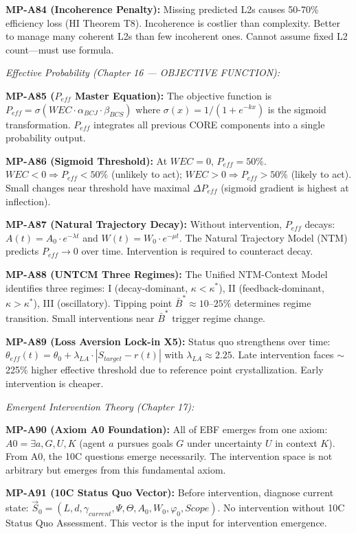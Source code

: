 \begin{tcolorbox}[colback=gray!5!white, colframe=gray!75!black,
    title=\textbf{MP Axioms}]
\textbf{MP-A84 (Incoherence Penalty):} Missing predicted L2s causes 50-70\% efficiency loss (HI Theorem T8). Incoherence is costlier than complexity. Better to manage many coherent L2s than few incoherent ones. Cannot assume fixed L2 count---must use formula.

\medskip
\textit{Effective Probability (Chapter 16 --- OBJECTIVE FUNCTION):}

\textbf{MP-A85 ($P_{eff}$ Master Equation):} The objective function is $P_{eff} = \sigma(WEC \cdot \alpha_{BCJ} \cdot \beta_{BCS})$ where $\sigma(x) = 1/(1+e^{-kx})$ is the sigmoid transformation. $P_{eff}$ integrates all previous CORE components into a single probability output.

\textbf{MP-A86 (Sigmoid Threshold):} At $WEC = 0$, $P_{eff} = 50\%$. $WEC < 0 \Rightarrow P_{eff} < 50\%$ (unlikely to act); $WEC > 0 \Rightarrow P_{eff} > 50\%$ (likely to act). Small changes near threshold have maximal $\Delta P_{eff}$ (sigmoid gradient is highest at inflection).

\textbf{MP-A87 (Natural Trajectory Decay):} Without intervention, $P_{eff}$ decays: $A(t) = A_0 \cdot e^{-\lambda t}$ and $W(t) = W_0 \cdot e^{-\mu t}$. The Natural Trajectory Model (NTM) predicts $P_{eff} \to 0$ over time. Intervention is required to counteract decay.

\textbf{MP-A88 (UNTCM Three Regimes):} The Unified NTM-Context Model identifies three regimes: I (decay-dominant, $\kappa < \kappa^*$), II (feedback-dominant, $\kappa > \kappa^*$), III (oscillatory). Tipping point $\bar{B}^* \approx 10$--$25\%$ determines regime transition. Small interventions near $\bar{B}^*$ trigger regime change.

\textbf{MP-A89 (Loss Aversion Lock-in X5):} Status quo strengthens over time: $\theta_{eff}(t) = \theta_0 + \lambda_{LA} \cdot |S_{target} - r(t)|$ with $\lambda_{LA} \approx 2.25$. Late intervention faces $\sim$225\% higher effective threshold due to reference point crystallization. Early intervention is cheaper.

\medskip
\textit{Emergent Intervention Theory (Chapter 17):}

\textbf{MP-A90 (Axiom A0 Foundation):} All of EBF emerges from one axiom: $A0 = \exists a,G,U,K$ (agent $a$ pursues goals $G$ under uncertainty $U$ in context $K$). From A0, the 10C questions emerge necessarily. The intervention space is not arbitrary but emerges from this fundamental axiom.

\textbf{MP-A91 (10C Status Quo Vector):} Before intervention, diagnose current state: $\vec{S}_0 = (L, d, \gamma_{current}, \Psi, \Theta, A_0, W_0, \varphi_0, Scope)$. No intervention without 10C Status Quo Assessment. This vector is the input for intervention emergence.


\end{tcolorbox}
